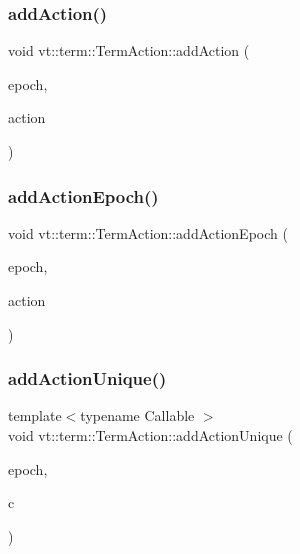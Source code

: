 \subsubsection{\texorpdfstring{add\+Action()}{addAction()}\hspace{0.1cm}{\footnotesize\ttfamily [2/2]}}
{\footnotesize\ttfamily void vt\+::term\+::\+Term\+Action\+::add\+Action (\begin{DoxyParamCaption}\item[{\hyperlink{namespacevt_a81d11b28122d43bf9834577e4a06440f}{Epoch\+Type} const \&}]{epoch,  }\item[{\hyperlink{namespacevt_ae0a5a7b18cc99d7b732cb4d44f46b0f3}{Action\+Type}}]{action }\end{DoxyParamCaption})}

\mbox{\label{structvt_1_1term_1_1_term_action_a2429a48171da578d25d7672486a24b51}} 
\subsubsection{\texorpdfstring{add\+Action\+Epoch()}{addActionEpoch()}}
{\footnotesize\ttfamily void vt\+::term\+::\+Term\+Action\+::add\+Action\+Epoch (\begin{DoxyParamCaption}\item[{\hyperlink{namespacevt_a81d11b28122d43bf9834577e4a06440f}{Epoch\+Type} const \&}]{epoch,  }\item[{\hyperlink{namespacevt_ae0a5a7b18cc99d7b732cb4d44f46b0f3}{Action\+Type}}]{action }\end{DoxyParamCaption})}

\mbox{\label{structvt_1_1term_1_1_term_action_a3ccd1689f56ab62821cfa6b1e65fc60b}} 
\subsubsection{\texorpdfstring{add\+Action\+Unique()}{addActionUnique()}}
{\footnotesize\ttfamily template$<$typename Callable $>$ \\
void vt\+::term\+::\+Term\+Action\+::add\+Action\+Unique (\begin{DoxyParamCaption}\item[{\hyperlink{namespacevt_a81d11b28122d43bf9834577e4a06440f}{Epoch\+Type} const \&}]{epoch,  }\item[{Callable \&\&}]{c }\end{DoxyParamCaption})}

